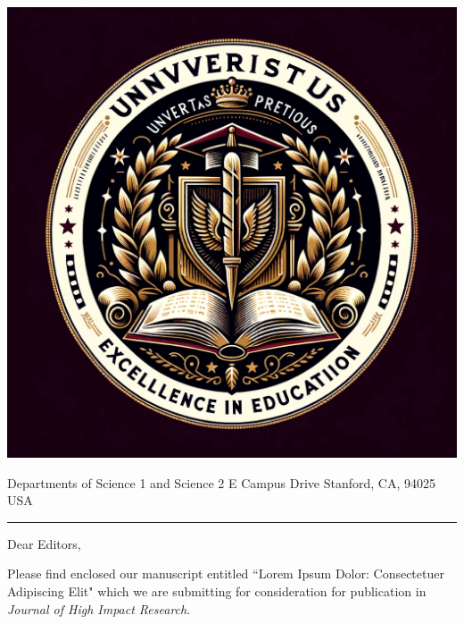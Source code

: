 \documentclass[11pt]{article}
\newcommand{\journalname}{Journal of High Impact Research} %
\newcommand{\mybullet}{\textbullet\hspace{0.5em}}
\begin{document}
\noindent
\begin{minipage}[t]{0.35\textwidth}
\vspace{0pt} %
\includegraphics[width=\linewidth]{logos/DALLE_logo.png} %
\end{minipage}
\hfill
\begin{minipage}[t]{0.6\textwidth}
\vspace{0pt} %
{\color{gray}\LARGE Departments of Science 1 and Science 2\color{black}\small{} E Campus Drive \mybullet Stanford, CA, 94025 \mybullet USA}
\end{minipage}

\vspace{1em} %
\noindent\rule{\linewidth}{1pt} %
\bigskip

\noindent Dear Editors,

\noindent Please find enclosed our manuscript entitled ``Lorem Ipsum Dolor: Consectetuer Adipiscing Elit" which we are submitting for consideration for publication in \textit{\journalname}.
\end{document}
